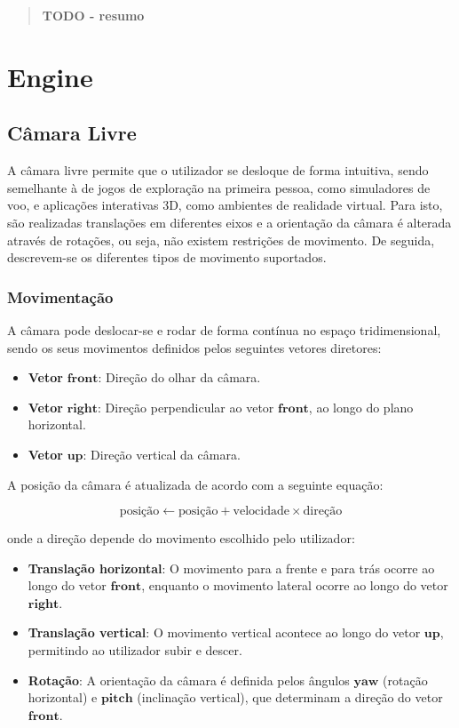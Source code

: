 \documentclass[12pt, a4paper]{article}
\begin{document}
\pagebreak

\begin{abstract}
    \textbf{\color{red} TODO - resumo}
\end{abstract}

\section{Engine}

\subsection{Câmara Livre}

A câmara livre permite que o utilizador se desloque de forma intuitiva, sendo semelhante à de
jogos de exploração na primeira pessoa, como simuladores de voo, e aplicações interativas 3D,
como ambientes de realidade virtual. Para isto, são realizadas translações em diferentes eixos
e a orientação da câmara é alterada através de rotações, ou seja, não existem restrições de
movimento.
De seguida, descrevem-se os diferentes tipos de movimento suportados.

\subsubsection{Movimentação}

A câmara pode deslocar-se e rodar de forma contínua no espaço tridimensional, sendo os seus
movimentos definidos pelos seguintes vetores diretores:

\begin{itemize}
    \item \textbf{Vetor} $\mathbf{front}$: Direção do olhar da câmara.
    \item \textbf{Vetor} $\mathbf{right}$: Direção perpendicular ao vetor $\mathbf{front}$, ao
          longo do plano horizontal.
    \item \textbf{Vetor} $\mathbf{up}$: Direção vertical da câmara.
\end{itemize}

A posição da câmara é atualizada de acordo com a seguinte equação:

\[
\text{posição} \gets \text{posição} + \text{velocidade} \times \text{direção}
\]

onde a direção depende do movimento escolhido pelo utilizador:

\begin{itemize}
    \item \textbf{Translação horizontal}: O movimento para a frente e para trás ocorre ao longo
          do vetor $\mathbf{front}$, enquanto o movimento lateral ocorre ao longo do vetor
          $\mathbf{right}$.
    \item \textbf{Translação vertical}: O movimento vertical acontece ao longo do vetor
          $\mathbf{up}$, permitindo ao utilizador subir e descer.
    \item \textbf{Rotação}: A orientação da câmara é definida pelos ângulos $\mathbf{yaw}$
          (rotação horizontal) e $\mathbf{pitch}$ (inclinação vertical), que determinam a direção
          do vetor $\mathbf{front}$.
\end{itemize}
\end{document}
